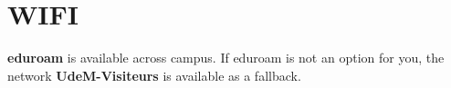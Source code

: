\section*{WIFI}
\textbf{eduroam} is available across campus. If eduroam is not an option for you, the network \textbf{UdeM-Visiteurs} is available as a fallback.